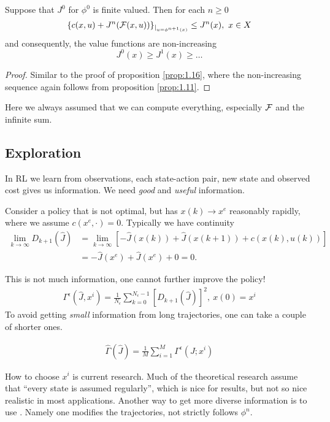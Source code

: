 \begin{proposition}\label{prop:1.17}
    Suppose that \(J^0\) for \(\phi^0\) is finite valued. Then 
    for each \(n\geq 0\)
    \[\{c(x,u)+J^n(\mathcal{F}(x,u))\}_{|_{u=\phi^{n+1}(x)}}\leq J^n(x),\ x\in X\]
    and consequently, the value functions are non-increasing
    \[J^0(x)\geq J^1(x)\geq \dots\]
\end{proposition}

\begin{proof}
    Similar to the proof of proposition \ref{prop:1.16}, where the non-increasing sequence again follows  
    from proposition \ref{prop:1.11}. 
\end{proof}

Here we always assumed that we can compute everything, especially \(\mathcal{F}\) and the infinite sum.

\subsection{Exploration}
In RL we learn from observations, each state-action pair,
new state and observed cost gives us information. We need 
\textit{good} and \textit{useful} information. 

Consider a policy that is not optimal, but has 
\(x(k)\to x^e\) reasonably rapidly, where we assume \(c(x^e,\cdot)=0\).
Typically we have continuity 
\begin{align*}
    \lim_{k\to \infty} D_{k+1}(\hat{J}) & = \lim_{k\to\infty} \left[
        -\hat{J}(x(k))+\hat{J}(x(k+1))+c(x(k),u(k))
    \right] \\
    &=-\hat{J}(x^e)+\hat{J}(x^e)+0=0. 
\end{align*}

This is not much information, one cannot further improve the policy! 
\begin{align*}
    \Gamma^\epsilon(\hat{J},x^i)=\frac{1}{N_\epsilon}\sum_{k=0}^{N_\epsilon-1}[D_{k+1}(\hat{J})]^2, \ x(0)=x^i
\end{align*}
To avoid getting \textit{small} information from long trajectories, one 
can take a couple of shorter ones.

\begin{align*}
    \hat{\Gamma}(\hat{J})=\frac{1}{M}\sum_{i=1}^M\Gamma^\epsilon(J;x^i)
\end{align*}

How to choose \(x^i\) is current research. Much of the theoretical research 
assume that ``every state is assumed regularly'', which is nice for results, but not so nice realistic 
in most applications. 
Another way to get more diverse information is to use . Namely
one modifies the trajectories, not strictly follows \(\phi^n\). 

